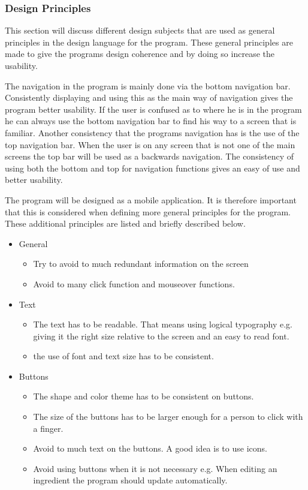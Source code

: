 \subsubsection{Design Principles}
This section will discuss different design subjects that are used as general principles in the design language for the program. These general principles are made to give the programs design coherence and by doing so increase the usability. 

The navigation in the program is mainly done via the bottom navigation bar. Consistently displaying and using this as the main way of navigation gives the program better usability. If the user is confused as to where he is in the program he can always use the bottom navigation bar to find his way to a screen that is familiar. Another consistency that the programs navigation has is the use of the top navigation bar. When the user is on any screen that is not one of the main screens the top bar will be used as a backwards navigation. The consistency of using both the bottom and top for navigation functions gives an easy of use and better usability.

The program will be designed as a mobile application. It is therefore important that this is considered when defining more general principles for the program. These additional principles are listed and briefly described below.

\begin{itemize}
	\item General
		\begin{itemize}
			\item Try to avoid to much redundant information on the screen
			\item Avoid to many click function and mouseover functions.
		\end{itemize}
	\item Text
		\begin{itemize}
			\item The text has to be readable. That means using logical typography e.g. giving it the right size relative to the screen and an easy to read font.	
			\item the use of font and text size has to be consistent.
		\end{itemize}
	\item Buttons
		\begin{itemize}
			\item The shape and color theme has to be consistent on buttons.
			\item The size of the buttons has to be larger enough for a person to click with a finger.
			\item Avoid to much text on the buttons. A good idea is to use icons.
			\item Avoid using buttons when it is not necessary e.g. When editing an ingredient the program should update automatically.
		\end{itemize}
\end{itemize}    

